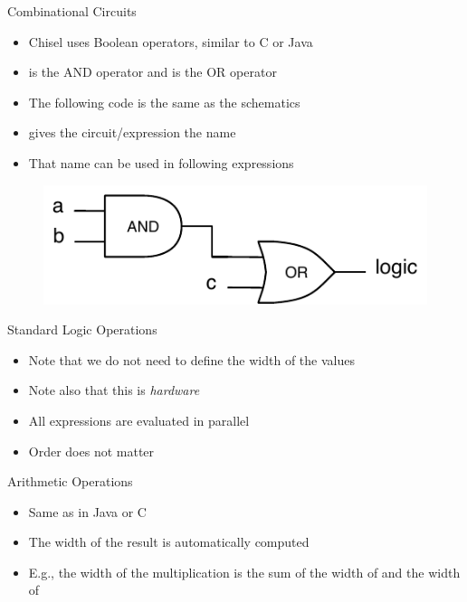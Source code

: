 \begin{frame}[fragile]{Combinational Circuits}
\begin{itemize}
\item Chisel uses Boolean operators, similar to C or Java
\item \code{\&} is the AND operator and \code{|} is the OR operator
\item The following code is the same as the schematics
\item {} gives the circuit/expression the name 
\item That name can be used in following expressions
\end{itemize}
\begin{figure}
  \includegraphics[scale=\scale]{../figures/logic}
\end{figure}
\end{frame}

\begin{frame}[fragile]{Standard Logic Operations}
\begin{itemize}
\item Note that we do not need to define the width of the values
\item Note also that this is \emph{hardware}
\item All expressions are evaluated in parallel
\item Order does not matter
\end{itemize}
\end{frame}

\begin{frame}[fragile]{Arithmetic Operations}
\begin{itemize}
\item Same as in Java or C
\item The width of the result is automatically computed
\item E.g., the width of the multiplication is the sum of the width of  and the width of  
\end{itemize}
\end{frame}

